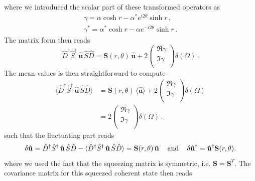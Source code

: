where we introduced the scalar part of these transformed operators as 
\begin{align*}
  \gamma = \alpha \cosh r - \alpha^* e^{i 2\theta} \sinh r \,, \\
  \gamma^* = \alpha^* \cosh r - \alpha e^{-i 2\theta} \sinh r \,.
\end{align*}
The matrix form then reads
\[\hat{D}^\dagger \hat{S}^\dagger  \,\mathbf{\hat{u}} \, \hat{S} \hat{D} = \mathbf{S}(r, \theta) \, \mathbf{\hat{u}} + 2 \begin{pmatrix}
\Re{\gamma} \\[4pt]
\Im{\gamma} \\
\end{pmatrix} \delta(\Omega) \,.\]
The mean values is then straightforward to compute
\begin{align*}
  \langle \hat{D}^\dagger \hat{S}^\dagger  \,\mathbf{\hat{u}} \, \hat{S} \hat{D} \rangle & =  \mathbf{S}(r, \theta) \, \langle \mathbf{\hat{u}}\rangle  + 2 \begin{pmatrix}
\Re{\gamma} \\[4pt]
\Im{\gamma} \\
\end{pmatrix} \delta(\Omega)  \\
  & = 2 \begin{pmatrix}
\Re{\gamma} \\[4pt]
\Im{\gamma} \\
\end{pmatrix} \delta(\Omega) \,.
\end{align*} 
such that the fluctuating part reads
\[\delta \mathbf{\hat{u}}^{\vphantom{\dagger}} = \hat{D}^\dagger \hat{S}^\dagger  \,\mathbf{\hat{u}} \, \hat{S} \hat{D} - \langle \hat{D}^\dagger \hat{S}^\dagger  \,\mathbf{\hat{u}} \, \hat{S} \hat{D} \rangle = \mathbf{S}(r, \theta) \, \mathbf{\hat{u}}^{\vphantom{\dagger}} \, \quad \text{and} \, \quad \delta \mathbf{\hat{u}}^{\dagger} =  \mathbf{\hat{u}}^{\dagger}  \mathbf{S}(r, \theta) .\]
where we used the fact that the squeezing matrix is symmetric, i.e. $\mathbf{S} = \mathbf{S}^T$.
The covariance matrix for this squeezed coherent state then reads
